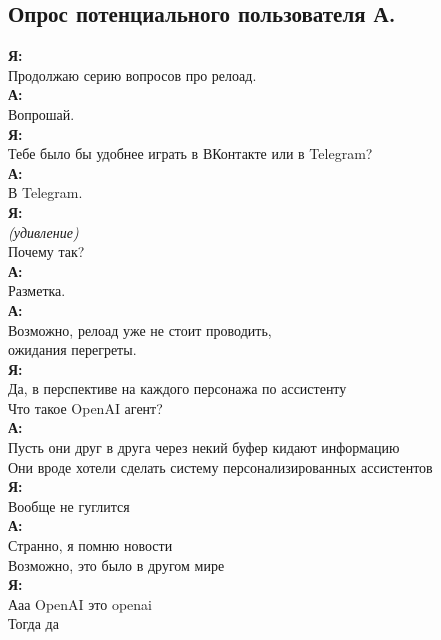 \subsection*{Опрос потенциального пользователя А.}
\textbf{Я:}\\
Продолжаю серию вопросов про релоад.\\

\textbf{А:}\\
Вопрошай.\\

\textbf{Я:}\\
Тебе было бы удобнее играть в ВКонтакте или в Telegram?\\

\textbf{А:}\\
В Telegram.\\

\textbf{Я:}\\
\textit{(удивление)}\\
Почему так?\\

\textbf{А:}\\
Разметка.\\

\textbf{А:}\\
Возможно, релоад уже не стоит проводить,\\
ожидания перегреты.\\

\textbf{Я:}\\
Да, в перспективе на каждого персонажа по ассистенту\\
Что такое OpenAI агент?\\

\textbf{А:}\\
Пусть они друг в друга через некий буфер кидают информацию\\
Они вроде хотели сделать систему персонализированных ассистентов\\

\textbf{Я:}\\
Вообще не гуглится\\

\textbf{А:}\\
Странно, я помню новости\\
Возможно, это было в другом мире\\

\textbf{Я:}\\
Ааа OpenAI это openai\\
Тогда да\\

